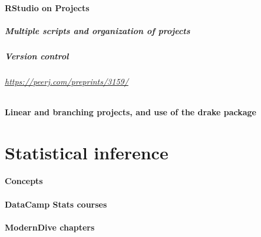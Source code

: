 \documentclass[]{book}
\let\oldparagraph\paragraph
\renewcommand{\paragraph}[1]{\oldparagraph{#1}\mbox{}}
\let\oldsubparagraph\subparagraph
\renewcommand{\subparagraph}[1]{\oldsubparagraph{#1}\mbox{}}
\theoremstyle{definition}
\theoremstyle{definition}
\theoremstyle{definition}
\theoremstyle{remark}
\begin{document}
\hypertarget{rstudio-on-projects}{%
\subsubsection{RStudio on Projects}\label{rstudio-on-projects}}

\hypertarget{multiple-scripts-and-organization-of-projects}{%
\paragraph{Multiple scripts and organization of
projects}\label{multiple-scripts-and-organization-of-projects}}

\hypertarget{version-control}{%
\paragraph{Version control}\label{version-control}}

\hypertarget{httpspeerj.compreprints3159}{%
\subparagraph{\texorpdfstring{\url{https://peerj.com/preprints/3159/}}{https://peerj.com/preprints/3159/}}\label{httpspeerj.compreprints3159}}

\hypertarget{linear-and-branching-projects-and-use-of-the-drake-package}{%
\subsubsection{Linear and branching projects, and use of the drake
package}\label{linear-and-branching-projects-and-use-of-the-drake-package}}

\hypertarget{statistical-inference}{%
\chapter{Statistical inference}\label{statistical-inference}}

\hypertarget{concepts}{%
\subsubsection{Concepts}\label{concepts}}

\hypertarget{datacamp-stats-courses}{%
\subsubsection{DataCamp Stats courses}\label{datacamp-stats-courses}}

\hypertarget{moderndive-chapters}{%
\subsubsection{ModernDive chapters}\label{moderndive-chapters}}
\end{document}
